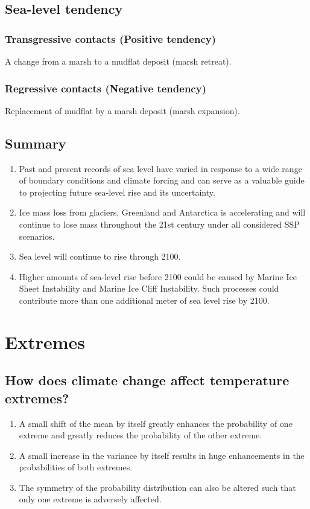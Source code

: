\documentclass[11pt]{article}
\begin{document}
\subsection{Sea-level tendency}
\label{sec:orgdfc8d21}

\subsubsection{Transgressive contacts (Positive tendency)}
\label{sec:org9d1d962}
A change from a marsh to a mudflat deposit (marsh retreat).
\subsubsection{Regressive contacts (Negative tendency)}
\label{sec:orgb365ab2}
Replacement of mudflat by a marsh deposit (marsh expansion).
\subsection{Summary}
\label{sec:org0305fe5}
\begin{enumerate}
\item Past and present records of sea level have varied in response to a wide range of boundary conditions and climate forcing and can serve as a valuable guide to projecting future sea-level rise and its uncertainty.
\item Ice mass loss from glaciers, Greenland and Antarctica is accelerating and will continue to lose mass throughout the 21st century under all considered SSP scenarios.
\item Sea level will continue to rise through 2100.
\item Higher amounts of sea-level rise before 2100 could be caused by Marine Ice Sheet Instability and Marine Ice Cliff Instability. Such processes could contribute more than one additional meter of sea level rise by 2100.
\end{enumerate}

\newpage
\section{Extremes}
\label{sec:orgfb25da0}

\subsection{How does climate change affect temperature extremes?}
\label{sec:org496f2f9}
\begin{enumerate}
\item A small shift of the mean by itself greatly enhances the probability of one extreme and greatly reduces the probability of the other extreme.
\item A small increase in the variance by itself results in huge enhancements in the probabilities of both extremes.
\item The symmetry of the probability distribution can also be altered such that only one extreme is adversely affected.
\end{enumerate}
\end{document}
